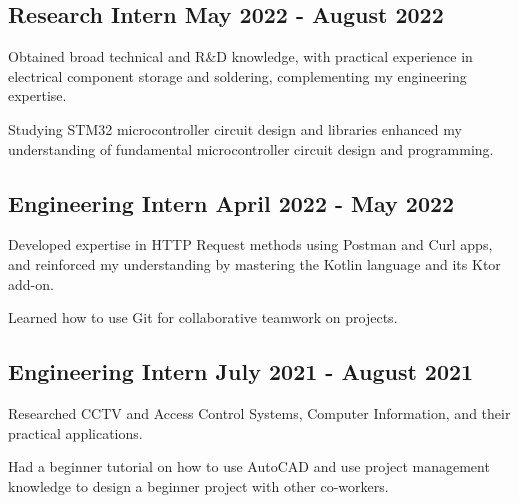 \documentclass[a4paper,12pt]{article}
\begin{document}

\vspace*{6pt}
\subsection{{Research Intern }\hfill May 2022 - August 2022}
\begin{zitemize}
\item Obtained broad technical and R\&D knowledge, with practical experience in electrical component storage and soldering, complementing my engineering expertise.
\item Studying STM32 microcontroller circuit design and libraries enhanced my understanding of fundamental microcontroller circuit design and programming.
\end{zitemize}

\vspace*{6pt}
\subsection{{Engineering Intern }\hfill April 2022 - May 2022}
\begin{zitemize}
\item Developed expertise in HTTP Request methods using Postman and Curl apps, and reinforced my understanding by mastering the Kotlin language and its Ktor add-on.
\item Learned how to use Git for collaborative teamwork on projects.
\end{zitemize}

\vspace*{6pt}
\subsection{{Engineering Intern }\hfill  July 2021 - August 2021}
\begin{zitemize}
\item Researched CCTV and Access Control Systems, Computer Information, and their practical applications.
\item Had a beginner tutorial on how to use AutoCAD and use project management knowledge to design a beginner project with other co-workers.
\end{zitemize}
\vspace*{6pt}
\end{document}
